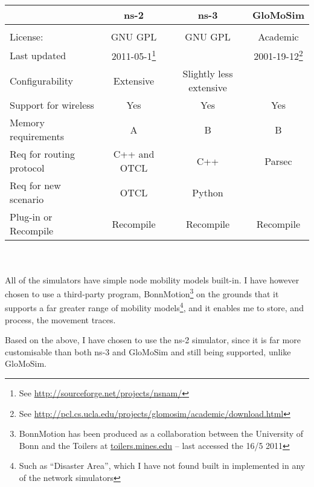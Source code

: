 \begin{minipage}{15.0cm}
\begin{tabular}[4]{l|c|c|c}
                          & ns-2      & ns-3    & GloMoSim  \\
\hline\\
License:                  & GNU GPL   & GNU GPL & Academic  \\
Last updated              & 2011-05-1\footnote{See \url{http://sourceforge.net/projects/nsnam/}} & & 2001-19-12\footnote{See \url{http://pcl.cs.ucla.edu/projects/glomosim/academic/download.html}}\\
Configurability           & Extensive & Slightly less extensive \\
Support for wireless      & Yes       & Yes    &Yes \\
Memory requirements       & A & B & B \\
Req for routing protocol  & C++ and OTCL & C++ & Parsec \\
Req for new scenario      & OTCL      & Python  & \\
Plug-in or Recompile      & Recompile & Recompile  & Recompile
\end{tabular}
\end{minipage}\\\\

All of the simulators have simple node mobility models built-in. I have however chosen to use a third-party program, BonnMotion\footnote{BonnMotion has been produced as a collaboration between the University of Bonn and the Toilers at \url{toilers.mines.edu} -- last accessed the 16/5 2011} on the grounds that it supports a far greater range of mobility models\footnote{Such as ``Disaster Area'', which I have not found built in implemented in any of the network simulators}, and it enables me to store, and process, the movement traces.

Based on the above, I have chosen to use the ns-2 simulator, since it is far more customisable than both ns-3 and GloMoSim and still being supported, unlike GloMoSim.
